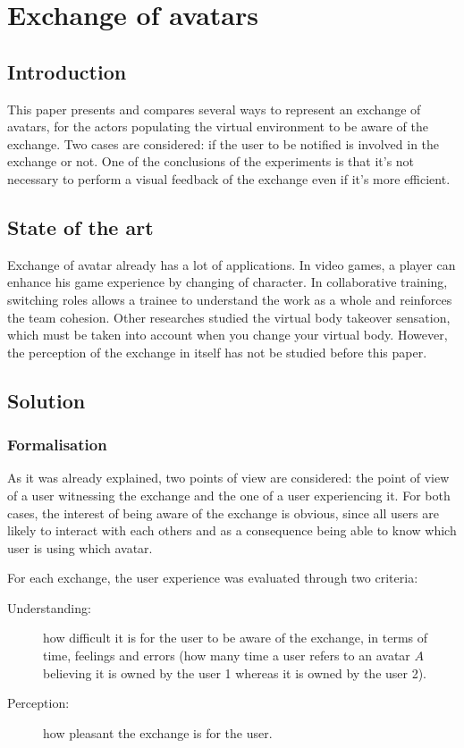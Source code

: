 \documentclass[a4paper]{article}
\begin{document}
\section{Exchange of avatars}

\subsection{Introduction}

This paper presents and compares several ways to represent an exchange of avatars, for the actors populating the virtual environment to be aware of the exchange. Two cases are considered: if the user to be notified is involved in the exchange or not. One of the conclusions of the experiments is that it's not necessary to perform a visual feedback of the exchange even if it's more efficient.

\subsection{State of the art}

Exchange of avatar already has a lot of applications. In video games, a player can enhance his game experience by changing of character. In collaborative training, switching roles allows a trainee to understand the work as a whole and reinforces the team cohesion. Other researches studied the virtual body takeover sensation, which must be taken into account when you change your virtual body. However, the perception of the exchange in itself has not be studied before this paper.

\subsection{Solution}

\subsubsection{Formalisation}
As it was already explained, two points of view are considered: the point of view of a user witnessing the exchange and the one of a user experiencing it. For both cases, the interest of being aware of the exchange is obvious, since all users are likely to interact with each others and as a consequence being able to know which user is using which avatar.

For each exchange, the user experience was evaluated through two criteria:
\begin{description}
	\item[Understanding:] how difficult it is for the user to be aware of the exchange, in terms of time, feelings and errors (how many time a user refers to an avatar $A$ believing it is owned by the user 1 whereas it is owned by the user 2).
	\item[Perception:] how pleasant the exchange is for the user.
\end{description}
\end{document}

